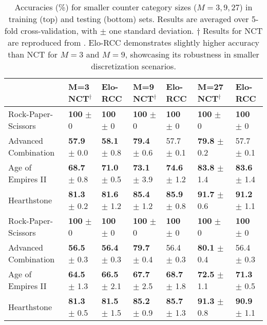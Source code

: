 \begin{table*}[!htb]
\centering
\caption{Accuracies (\%) for smaller counter category sizes ($M=3, 9, 27$) in training (top) and testing (bottom) sets. Results are averaged over 5-fold cross-validation, with $\pm$ one standard deviation. $\dagger$ Results for NCT are reproduced from \citet{game_balance_analysis}. Elo-RCC demonstrates slightly higher accuracy than NCT for $M=3$ and $M=9$, showcasing its robustness in smaller discretization scenarios.}

\label{table:precision_test2}
\begin{tabular}{l|ll|ll|ll}
\toprule
\quad & M=3 \textbf{NCT$^\dagger$} & \textbf{Elo-RCC} & M=9 \textbf{NCT$^\dagger$} & \textbf{Elo-RCC} & M=27 \textbf{NCT$^\dagger$} & \textbf{Elo-RCC} \\
\midrule
Rock-Paper-Scissors & \textbf{100} $\pm$ 0 & \textbf{100} $\pm$ 0 & \textbf{100} $\pm$ 0 & \textbf{100} $\pm$ 0 & \textbf{100} $\pm$ 0 & \textbf{100} $\pm$ 0\\
\midrule
Advanced Combination & \textbf{57.9} $\pm$ 0.0 & \textbf{58.1} $\pm$ 0.8 & \textbf{79.4} $\pm$ 0.6 & 57.7 $\pm$ 0.1 & \textbf{79.8} $\pm$ 0.2 & 57.7 $\pm$ 0.1\\
\midrule
Age of Empires II & \textbf{68.7} $\pm$ 0.8 & \textbf{71.0} $\pm$ 0.5 & \textbf{73.1} $\pm$ 3.9 & \textbf{74.6} $\pm$ 1.2 & \textbf{83.8} $\pm$ 1.4 & \textbf{83.6} $\pm$ 1.4\\
\midrule
Hearthstone & \textbf{81.3} $\pm$ 0.2 & \textbf{81.6} $\pm$ 1.2 & \textbf{85.4} $\pm$ 1.2 & \textbf{85.9} $\pm$ 0.8 & \textbf{91.7} $\pm$ 0.6 & \textbf{91.2} $\pm$ 1.1\\
\bottomrule
\toprule
Rock-Paper-Scissors & \textbf{100} $\pm$ 0 & \textbf{100} $\pm$ 0 & \textbf{100} $\pm$ 0 & \textbf{100} $\pm$ 0 & \textbf{100} $\pm$ 0 & \textbf{100} $\pm$ 0\\
\midrule
Advanced Combination & \textbf{56.5} $\pm$ 0.3 & \textbf{56.4} $\pm$ 0.3 & \textbf{79.7} $\pm$ 0.4 & 56.4 $\pm$ 0.3 & \textbf{80.1} $\pm$ 0.4 & 56.4 $\pm$ 0.3\\
\midrule
Age of Empires II & \textbf{64.5} $\pm$ 1.3 & \textbf{66.5} $\pm$ 2.1 & \textbf{67.7} $\pm$ 2.5 & \textbf{68.7} $\pm$ 1.8 & \textbf{72.5} $\pm$ 1.1 & \textbf{71.3} $\pm$ 0.5\\
\midrule
Hearthstone & \textbf{81.3} $\pm$ 0.5 & \textbf{81.5} $\pm$ 1.5 & \textbf{85.2} $\pm$ 0.9 & \textbf{85.7} $\pm$ 1.3 & \textbf{91.3} $\pm$ 0.8 & \textbf{90.9} $\pm$ 1.1\\
\bottomrule
\end{tabular}
\end{table*}

